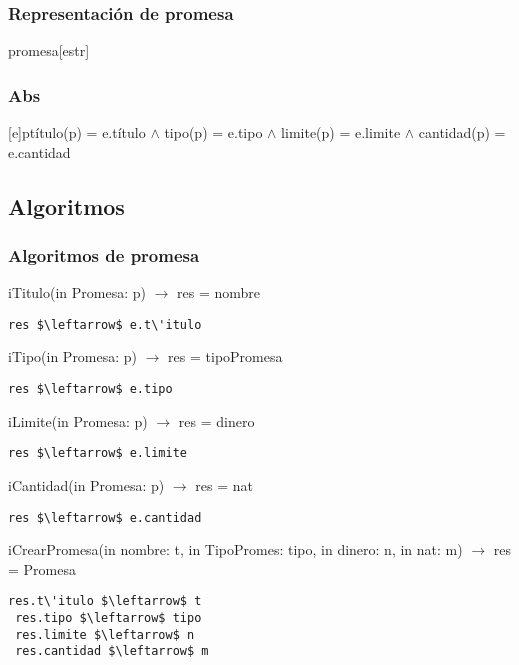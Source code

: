 \subsubsection{Representaci\'on de promesa}
\begin{Estructura}{promesa}[estr]
    \begin{Tupla}[estr]
    \end{Tupla}
\end{Estructura}



\subsubsection{Abs}
[e]{p}{t\'itulo(p) = e.t\'itulo $\land$ tipo(p) = e.tipo $\land$ limite(p) = e.limite $\land$ cantidad(p) = e.cantidad}

  \subsection{Algoritmos}
\subsubsection{Algoritmos de promesa}

iTitulo(in Promesa: p) $\rightarrow$ res = nombre
\begin{lstlisting}[mathescape]
 res $\leftarrow$ e.t\'itulo
\end{lstlisting}

iTipo(in Promesa: p) $\rightarrow$ res = tipoPromesa
\begin{lstlisting}[mathescape]
 res $\leftarrow$ e.tipo
\end{lstlisting}

iLimite(in Promesa: p) $\rightarrow$ res = dinero
\begin{lstlisting}[mathescape]
 res $\leftarrow$ e.limite
\end{lstlisting}


iCantidad(in Promesa: p) $\rightarrow$ res = nat
\begin{lstlisting}[mathescape]
 res $\leftarrow$ e.cantidad
\end{lstlisting}

iCrearPromesa(in nombre: t, in TipoPromes: tipo, in dinero: n, in nat: m) $\rightarrow$ res = Promesa
\begin{lstlisting}[mathescape]
 res.t\'itulo $\leftarrow$ t
 res.tipo $\leftarrow$ tipo
 res.limite $\leftarrow$ n
 res.cantidad $\leftarrow$ m
\end{lstlisting}
